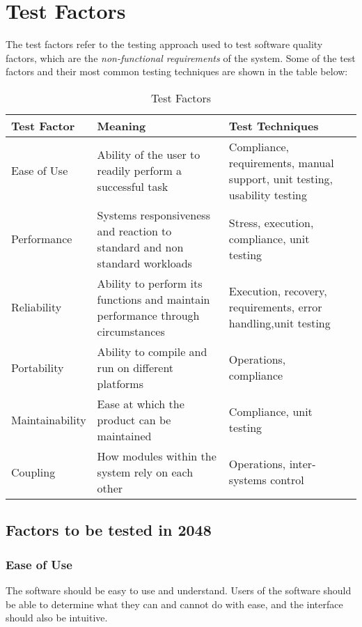 \documentclass[12pt]{article}
\begin{document}

\section{Test Factors}
The test factors refer to the testing approach used to test software quality 
factors, which are the \emph{non-functional requirements} of the system. Some 
of the test factors and their most common testing techniques are shown in the 
table below:
\begin{table}[!htbp]
	\centering
	\begin{tabular}{ | l |p{5cm}|p{5cm}| l | |}
		\hline
		Test Factor & Meaning & Test Techniques \\ \hline
		Ease of Use & Ability of the user to readily perform a successful task 
		& Compliance, requirements, manual support, unit testing, usability 
		testing \\ \hline
		Performance & Systems responsiveness and reaction to standard and non 
		standard workloads & Stress, execution, compliance, unit testing \\
		\hline
		Reliability & Ability to perform its functions and maintain performance 
		through circumstances & Execution, recovery, requirements, error 		
		handling,unit testing  \\ \hline
		Portability & Ability to compile and run on different platforms &  
		Operations, compliance \\ \hline
		Maintainability & Ease at which the product can be maintained & 		
		Compliance, unit testing \\ \hline 
		Coupling & How modules within the system rely on each other & 
		Operations, inter-systems control \\ 
		\hline
	\end{tabular}
	\caption{Test Factors}
\end{table}

\subsection{Factors to be tested in 2048}
\subsubsection{Ease of Use}
The software should be easy to use and understand. Users of the software should 
be able to determine what they can and cannot do with ease, and the interface 
should also be intuitive.\\
\end{document}
